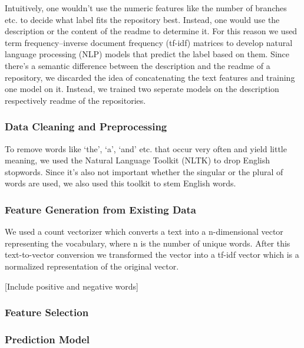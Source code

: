 \documentclass[%
a4paper,
DIV12,
2.5headlines,
bigheadings,
titlepage,
openbib,
]{scrartcl}
\begin{document}
Intuitively, one wouldn't use the numeric features like the number of branches etc. to decide what label fits the repository best.
Instead, one would use the description or the content of the readme to determine it.
For this reason we used term frequency--inverse document frequency (tf-idf) matrices to develop natural language processing (NLP) models that predict the label based on them.
Since there's a semantic difference between the description and the readme of a repository, we discarded the idea of concatenating the text features and training one model on it.
Instead, we trained two seperate models on the description respectively readme of the repositories.

\subsubsection{Data Cleaning and
Preprocessing}\label{data-cleaning-and-preprocessing-1}

To remove words like `the', `a', `and' etc. that occur very often and yield little meaning, we used the Natural Language Toolkit (NLTK) to drop English stopwords.
Since it's also not important whether the singular or the plural of words are used, we also used this toolkit to stem English words.

\subsubsection{Feature Generation from Existing
Data}\label{feature-generation-from-existing-data}

We used a count vectorizer which converts a text into a n-dimensional vector representing the vocabulary, where n is the number of unique words.
After this text-to-vector conversion we transformed the vector into a tf-idf vector which is a normalized representation of the original vector.

[Include positive and negative words]

\subsubsection{Feature Selection}\label{feature-selection-1}


\subsubsection{Prediction Model}\label{prediction-model-1}
\end{document}
